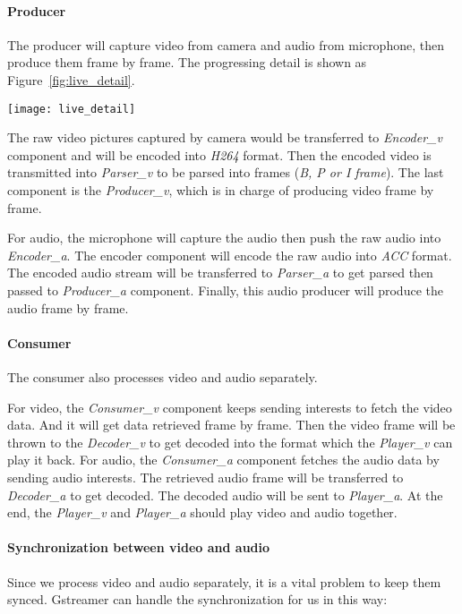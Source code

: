 \paragraph {Producer}
The producer will capture video from camera and audio from microphone, then produce them frame by frame. The progressing detail is shown as Figure~\ref{fig:live_detail}.

\begin{figure*}%
  \centering
  \texttt{[image: live\_detail]}
  \caption{Live Streaming Media Processing}
  \label{fig:live_detail}
\end{figure*}

The raw video pictures captured by camera would be transferred to \textit{Encoder\_v} component and will be encoded into \textit{H264} format. Then the encoded video is transmitted into \textit{Parser\_v} to be parsed into frames (\textit{B, P or I frame}). The last component is the \textit{Producer\_v}, which is in charge of producing video frame by frame.

For audio, the microphone will capture the audio then push the raw audio into \textit{Encoder\_a}. The encoder component will encode the raw audio into \textit{ACC} format. The encoded audio stream will be transferred to \textit{Parser\_a} to get parsed then passed to \textit{Producer\_a} component. Finally, this audio producer will produce the audio frame by frame.

\paragraph {Consumer}
The consumer also processes video and audio separately.

For video, the \textit{Consumer\_v} component keeps sending interests to fetch the video data. And it will get data retrieved frame by frame. Then the video frame will be thrown to the \textit{Decoder\_v} to get decoded into the format which the \textit{Player\_v} can play it back.
For audio, the \textit{Consumer\_a} component fetches the audio data by sending audio interests. The retrieved audio frame will be transferred to \textit{Decoder\_a} to get decoded. The decoded audio will be sent to \textit{Player\_a}. At the end, the \textit{Player\_v} and \textit{Player\_a} should play video and audio together.

\paragraph {Synchronization between video and audio}
\label{par:sync}
Since we process video and audio separately, it is a vital problem to keep them synced. Gstreamer can handle the synchronization for us in this way:

